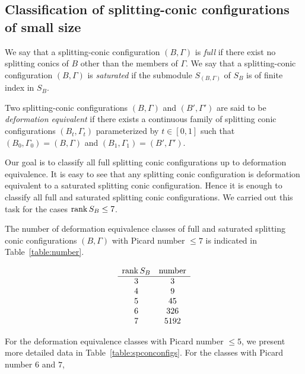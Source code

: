 \documentclass{amsart} %
\begin{document}
\subsection{Classification of splitting-conic configurations  of small size}\label{subsec:B}
%
%
%
\begin{definition}
We say that a splitting-conic configuration $(B,\Gamma)$
is \emph{full} if there exist no splitting conics of $B$
other than the members of $\Gamma$.
We say that a splitting-conic configuration $(B,\Gamma)$
is \emph{saturated} if 
the submodule $S_{(B, \Gamma)}$ of $S_B$ is of finite index in $S_B$.
\end{definition}
%
\begin{definition}
Two splitting-conic configurations $(B,\Gamma)$
and $(B',\Gamma')$ are said to be
\emph{deformation equivalent}
if there exists a continuous family of splitting conic  configurations
$(B_t,\Gamma_t)$ parameterized by
$t \in [0,1]$ such that
$(B_0,\Gamma_0)=(B,\Gamma)$
and $(B_1,\Gamma_1)=(B',\Gamma')$.
\end{definition}
%
Our goal is to classify all full splitting conic configurations
up to deformation equivalence.
It is easy to see that any splitting conic configuration
is deformation equivalent to a saturated splitting conic configuration.
Hence it is enough to classify all full and saturated
splitting conic configurations.
We carried out this task for the cases $\operatorname{rank} S_B\le 7$.
%
\begin{theorem}
The number of deformation equivalence classes
of  full and saturated splitting conic configurations $(B, \Gamma)$  with
Picard number $\le 7$
is indicated in Table~\ref{table:number}.
\end{theorem}
%
\begin{table}
\[
\begin{array}{cc}
\operatorname{rank} S_{B}   &\textrm{number} \\
\hline 
3 & 3 \\
4 & 9 \\
5 & 45 \\
6 & 326 \\
7 & 5192
\end{array}
\]
\caption{Number of deformation equivalence classes}\label{table:number}
\end{table}
%
For the deformation equivalence classes with Picard number  $\le 5$,
we present more detailed data in Table~\ref{table:spconconfigs}.
For the classes with Picard number  $6$ and $7$,
\end{document}

